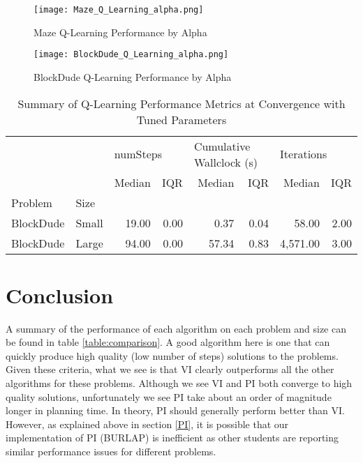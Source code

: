 \documentclass{article}
\begin{document}
\begin{figure}
    \centering
    \begin{minipage}{0.5\textwidth}
        \centering
        \texttt{[image: Maze\_Q\_Learning\_alpha.png]}
        \caption{Maze Q-Learning Performance by Alpha}
        \label{fig:maze-ql-alpha}
    \end{minipage}\hfill
    \begin{minipage}{0.5\textwidth}
        \centering
        \texttt{[image: BlockDude\_Q\_Learning\_alpha.png]}
        \caption{BlockDude Q-Learning Performance by Alpha}
        \label{fig:bd-ql-alpha}
    \end{minipage}
\end{figure}

\begin{table}
    \centering
    \caption{Summary of Q-Learning Performance Metrics at Convergence with Tuned Parameters}
    \label{table:large-bd-ql}
    \begin{tabular}{llrrrrrr}
        \toprule
           &     & \multicolumn{2}{l}{numSteps} & \multicolumn{2}{l}{Cumulative Wallclock (s)} & \multicolumn{2}{l}{Iterations} \\
           &     &   Median &  IQR &           Median &    IQR &    Median &   IQR \\
        Problem & Size &          &      &                  &        &           &       \\
        \midrule
        BlockDude & Small &    19.00 & 0.00 &         0.37 &  0.04  &     58.00 &  2.00 \\
        BlockDude & Large &    94.00 & 0.00 &         57.34 &  0.83 &  4,571.00 &  3.00 \\
        \bottomrule
        \end{tabular}               
    \end{table} 


\section{Conclusion}

A summary of the performance of each algorithm on each problem and size can be found in table \ref{table:comparison}.
A good algorithm here is one that can quickly produce high quality (low number of steps) solutions to the problems.
Given these criteria, what we see is that VI clearly outperforms all the other algorithms for these problems. Although 
we see VI and PI both converge to high quality solutions, unfortunately we see PI take about an order of magnitude longer
in planning time. In theory, PI should generally perform better than VI. However, as explained above in section
\ref{PI}, it is possible that our implementation of PI (BURLAP) is inefficient as other students are reporting similar
performance issues for different problems.
\end{document}
